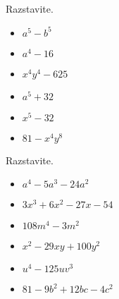    
        
            \begin{naloga}
                Razstavite.
                \begin{itemize}
                    \item $a^5-b^5$ 
                    \item $a^4-16$ 
                    \item $x^4y^4-625$ 
                    \item $a^5+32$ 
                    \item $x^5-32$ 
                    \item $81-x^4y^8$ 
                \end{itemize}
            \end{naloga}
        
    
        
            \begin{naloga}
                Razstavite.
                \begin{itemize}
                    \item $a^4-5a^3-24a^2$ 
                    \item $3x^3+6x^2-27x-54$ 
                    \item $108m^4-3m^2$ 
                    \item $x^2-29xy+100y^2$ 
                    \item $u^4-125uv^3$ 
                    \item $81-9b^2+12bc-4c^2$ 
                \end{itemize}
            \end{naloga}
        
    